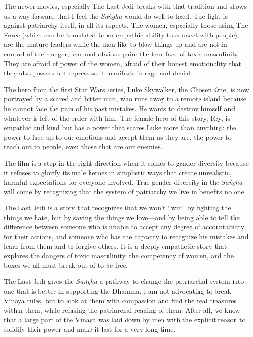 The newer movies, especially The Last Jedi breaks with that tradition and shows us a way forward that I feel the {\em Saṅgha} would do well to heed. The fight is against patriarchy itself, in all its aspects. The women, especially those using The Force (which can be translated to an empathic ability to connect with people), are the mature leaders while the men like to blow things up and are not in control of their anger, fear and obvious pain: the true face of toxic masculinity. They are afraid of power of the women, afraid of their honest emotionality that they also possess but repress so it manifests in rage and denial.

The hero from the first Star Wars series, Luke Skywalker, the Chosen One, is now portrayed by a scared and bitter man, who runs away to a remote island because he cannot face the pain of his past mistakes. He wants to destroy himself and whatever is left of the order with him. The female hero of this story, Rey, is empathic and kind but has a power that scares Luke more than anything: the power to face up to our emotions and accept them as they are, the power to reach out to people, even those that are our enemies. 

The film is a step in the right direction when it comes to gender diversity because it refuses to glorify its male heroes in simplistic ways that create unrealistic, harmful expectations for everyone involved. True gender diversity in the {\em Saṅgha} will come by recognizing that the system of patriarchy we live in benefits no one. 

The Last Jedi is a story that recognizes that we won’t “win” by fighting the things we hate, but by saving the things we love—and by being able to tell the difference between someone who is unable to accept any degree of accountability for their actions, and someone who has the capacity to recognize his mistakes and learn from them and to forgive others. It is a deeply empathetic story that explores the dangers of toxic masculinity, the competency of women, and the boxes we all must break out of to be free.

The Last Jedi gives the {\em Saṅgha} a pathway to change the patriarchal system into one that is better in supporting the Dhamma. I am not advocating to break Vinaya rules, but to look at them with compassion and find the real treasures within them, while refusing the patriarchal reading of them. After all, we know that a large part of the Vinaya was laid down by men with the explicit reason to solidify their power and make it last for a very long time.







